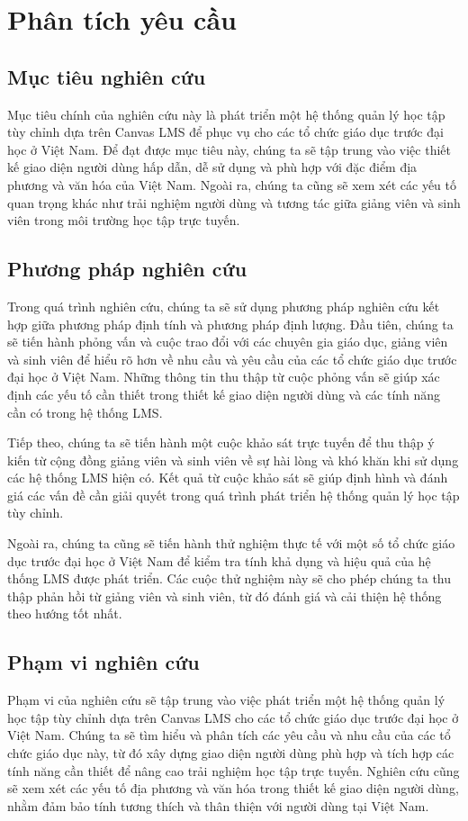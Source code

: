 \documentclass[../Thesis.tex]{subfiles}
\begin{document}
\section{Phân tích yêu cầu}
    \subsection{Mục tiêu nghiên cứu}
    Mục tiêu chính của nghiên cứu này là phát triển một hệ thống quản lý học tập tùy chỉnh dựa trên Canvas LMS để phục vụ cho các tổ chức giáo dục trước đại học ở Việt Nam. Để đạt được mục tiêu này, chúng ta sẽ tập trung vào việc thiết kế giao diện người dùng hấp dẫn, dễ sử dụng và phù hợp với đặc điểm địa phương và văn hóa của Việt Nam. Ngoài ra, chúng ta cũng sẽ xem xét các yếu tố quan trọng khác như trải nghiệm người dùng và tương tác giữa giảng viên và sinh viên trong môi trường học tập trực tuyến.
    \subsection{Phương pháp nghiên cứu}
    Trong quá trình nghiên cứu, chúng ta sẽ sử dụng phương pháp nghiên cứu kết hợp giữa phương pháp định tính và phương pháp định lượng. Đầu tiên, chúng ta sẽ tiến hành phỏng vấn và cuộc trao đổi với các chuyên gia giáo dục, giảng viên và sinh viên để hiểu rõ hơn về nhu cầu và yêu cầu của các tổ chức giáo dục trước đại học ở Việt Nam. Những thông tin thu thập từ cuộc phỏng vấn sẽ giúp xác định các yếu tố cần thiết trong thiết kế giao diện người dùng và các tính năng cần có trong hệ thống LMS.

    Tiếp theo, chúng ta sẽ tiến hành một cuộc khảo sát trực tuyến để thu thập ý kiến từ cộng đồng giảng viên và sinh viên về sự hài lòng và khó khăn khi sử dụng các hệ thống LMS hiện có. Kết quả từ cuộc khảo sát sẽ giúp định hình và đánh giá các vấn đề cần giải quyết trong quá trình phát triển hệ thống quản lý học tập tùy chỉnh.

    Ngoài ra, chúng ta cũng sẽ tiến hành thử nghiệm thực tế với một số tổ chức giáo dục trước đại học ở Việt Nam để kiểm tra tính khả dụng và hiệu quả của hệ thống LMS được phát triển. Các cuộc thử nghiệm này sẽ cho phép chúng ta thu thập phản hồi từ giảng viên và sinh viên, từ đó đánh giá và cải thiện hệ thống theo hướng tốt nhất.
    \subsection{Phạm vi nghiên cứu}
    Phạm vi của nghiên cứu sẽ tập trung vào việc phát triển một hệ thống quản lý học tập tùy chỉnh dựa trên Canvas LMS cho các tổ chức giáo dục trước đại học ở Việt Nam. Chúng ta sẽ tìm hiểu và phân tích các yêu cầu và nhu cầu của các tổ chức giáo dục này, từ đó xây dựng giao diện người dùng phù hợp và tích hợp các tính năng cần thiết để nâng cao trải nghiệm học tập trực tuyến. Nghiên cứu cũng sẽ xem xét các yếu tố địa phương và văn hóa trong thiết kế giao diện người dùng, nhằm đảm bảo tính tương thích và thân thiện với người dùng tại Việt Nam.
\end{document}
